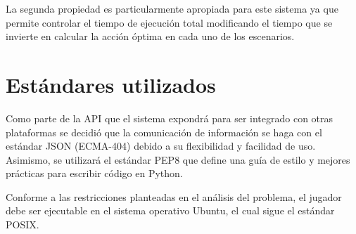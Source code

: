 La segunda propiedad es particularmente apropiada para este sistema ya que
permite controlar el tiempo de ejecución total modificando el tiempo que se
invierte en calcular la acción óptima en cada uno de los escenarios.

\section{Estándares utilizados}

Como parte de la API que el sistema expondrá para ser integrado con otras
plataformas se decidió que la comunicación de información se haga con el
estándar JSON (ECMA-404) debido a su flexibilidad y facilidad de uso. Asimismo,
se utilizará el estándar PEP8 que define una guía de estilo y mejores prácticas
para escribir código en Python.

Conforme a las restricciones planteadas en el análisis del problema, el jugador
debe ser ejecutable en el sistema operativo Ubuntu, el cual sigue el estándar
POSIX.







